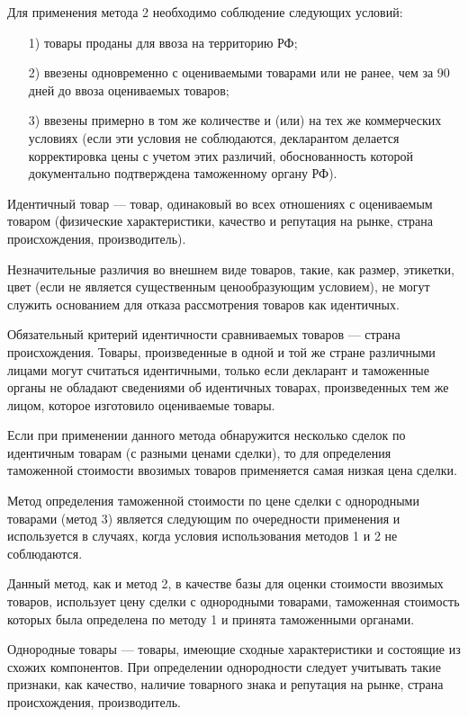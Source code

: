 Для применения метода 2 необходимо соблюдение следующих условий:
\begin{enumerate}
	\item [1)] товары проданы для ввоза на территорию РФ;
	\item [2)] ввезены одновременно с оцениваемыми товарами или не ранее, чем за 90 дней до ввоза оцениваемых товаров;
	\item [3)] ввезены примерно в том же количестве и (или) на тех же коммерческих условиях (если эти условия не соблюдаются, декларантом делается корректировка цены с учетом этих различий, обоснованность которой документально подтверждена таможенному органу РФ).
\end{enumerate}

Идентичный товар --- товар, одинаковый во всех отношениях с оцениваемым товаром (физические характеристики, качество и репутация на рынке, страна происхождения, производитель).

Незначительные различия во внешнем виде товаров, такие, как размер, этикетки, цвет (если не является существенным ценообразующим условием), не могут служить основанием для отказа рассмотрения товаров как идентичных.

Обязательный критерий идентичности сравниваемых товаров --- страна происхождения. Товары, произведенные в одной и той же стране различными лицами могут считаться идентичными, только если декларант и таможенные органы не обладают сведениями об идентичных товарах, произведенных тем же лицом, которое изготовило оцениваемые товары.

Если при применении данного метода обнаружится несколько сделок по идентичным товарам (с разными ценами сделки), то для определения таможенной стоимости ввозимых товаров применяется самая низкая цена сделки.

Метод определения таможенной стоимости по цене сделки с однородными товарами (метод 3) является следующим по очередности применения и используется в случаях, когда условия использования методов 1 и 2 не соблюдаются.

Данный метод, как и метод 2, в качестве базы для оценки стоимости ввозимых товаров, использует цену сделки с однородными товарами, таможенная стоимость которых была определена по методу 1 и принята таможенными органами.

Однородные товары --- товары, имеющие сходные характеристики и состоящие из схожих компонентов. При определении однородности следует учитывать такие признаки, как качество, наличие товарного знака и репутация на рынке, страна происхождения, производитель.

